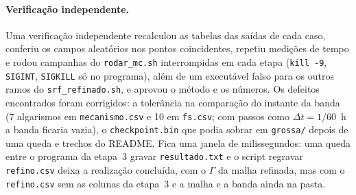 \paragraph{Verificação independente.} Uma verificação independente recalculou as tabelas das saídas de cada caso,
conferiu os campos aleatórios nos pontos coincidentes, repetiu medições de tempo e rodou campanhas do
\texttt{rodar\_mc.sh} interrompidas em cada etapa (\texttt{kill -9}, \texttt{SIGINT}, \texttt{SIGKILL} só no programa),
além de um executável falso para os outros ramos do \texttt{srf\_refinado.sh}, e aprovou o método e os números. Os
defeitos encontrados foram corrigidos: a tolerância na comparação do instante da banda (7 algarismos em
\texttt{mecanismo.csv} e 10 em \texttt{fs.csv}; com passos como $\Delta t = 1/60$~h a banda ficaria vazia), o
\texttt{checkpoint.bin} que podia sobrar em \texttt{grossa/} depois de uma queda e trechos do README. Fica uma janela
de milissegundos: uma queda entre o programa da etapa~3 gravar \texttt{resultado.txt} e o script regravar
\texttt{refino.csv} deixa a realização concluída, com o $\Gamma$ da malha refinada, mas com o \texttt{refino.csv} sem as
colunas da etapa~3 e a malha e a banda ainda na pasta.
